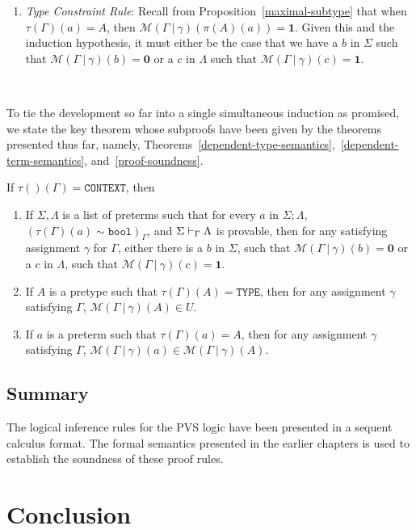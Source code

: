 \documentclass [12pt,twoside]{cslreport}
\newcommand{\thmbox}
   {{\ \hfill\hbox{%
      \vrule width1.0ex height1.0ex
   }\parfillskip 0pt }}
\newenvironment{proof}{{\bf Proof. }}{\thmbox}
\newcommand{\tauGamma}[1]{\tau(\Gamma)(#1)}
\newcommand{\Mgamma}[1]{{\mathcal M}(\Gamma\vbar\gamma)(#1)}
\newcommand{\oneb}{\mathbf{1}}
\newcommand{\zerob}{\mathbf{0}}
\newcommand{\ttbool}{\mathtt{bool}}
\newcommand{\tttype}{\mathtt{TYPE}}
\newcommand{\ttcontext}{\mathtt{CONTEXT}}
\newcommand{\vbar}{\ |\ }
\begin{document}
\begin{proof}
\begin{enumerate}
\begin{description}
\end{description}

\item \emph{Type Constraint Rule}: Recall from
Proposition~\ref{maximal-subtype}
that when $\tauGamma{a} = A$, then
$\Mgamma{\pi(A)(a)} = \oneb$.  Given this and the induction hypothesis,
it must either be the case that we have a $b$ in $\Sigma$ such that
$\Mgamma{b} = \zerob$ or a $c$ in $\Lambda$ such that $\Mgamma{c} =
\oneb$\@. 
\end{enumerate}
\end{proof}

To tie the development so far into a single simultaneous
induction as promised, we state the key theorem whose subproofs have been
given by the theorems presented thus far, namely,
Theorems~\ref{dependent-type-semantics},~\ref{dependent-term-semantics},
and~\ref{proof-soundness}\@.  
\begin{theorem}\label{big-soundness}
If $\tau()(\Gamma) = \ttcontext$, then 
\begin{enumerate}
\item If $\Sigma, \Lambda$ is a list of preterms such that for every $a$
in $\Sigma; \Lambda$, $(\tauGamma{a} \sim 
\ttbool)_\Gamma$, and $\Sigma\vdash_{\Gamma}\Lambda$ is provable, then
for any satisfying assignment
$\gamma$ for $\Gamma$, 
either there is a $b$ in $\Sigma$, such that $\Mgamma{b} = \zerob$ or a $c$ in
$\Lambda$, such that $\Mgamma{c} = \oneb$\@.

\item If $A$ is a pretype such that $\tauGamma{A} = \tttype$, then for any
assignment $\gamma$ 
satisfying $\Gamma$, $\Mgamma{A}\in U$\@.

\item If $a$ is a preterm such that $\tauGamma{a} = A$, then for any
assignment $\gamma$ satisfying $\Gamma$, $\Mgamma{a}\in \Mgamma{A}$\@.
\end{enumerate}
\end{theorem}


\section{Summary}

The logical inference rules for the PVS logic have been presented in a
sequent calculus format.  The formal semantics presented in the earlier
chapters is used to establish the soundness of these proof rules.


\chapter{Conclusion}\label{conclusion}
\end{document}

